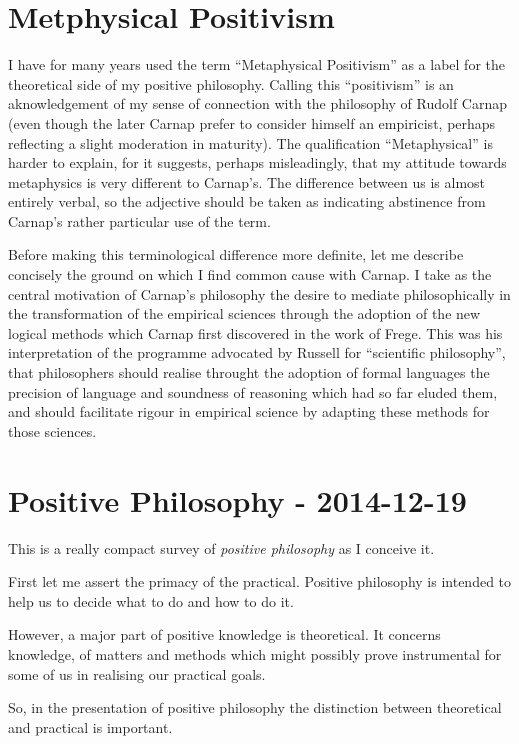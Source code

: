 \documentclass[10pt,titlepage]{article}
\begin{document}
\section{Metphysical Positivism}

I have for many years used the term ``Metaphysical Positivism'' as a label for the
theoretical side of my positive philosophy.
Calling this ``positivism'' is an aknowledgement of my sense of connection with the
philosophy of Rudolf Carnap (even though the later Carnap prefer to consider himself
an empiricist, perhaps reflecting a slight moderation in maturity).
The qualification ``Metaphysical'' is harder to explain, for it suggests, perhaps misleadingly,
that my attitude towards metaphysics is very different to Carnap's.
The difference between us is almost entirely verbal, so the adjective should be taken as
indicating abstinence from Carnap's rather particular use of the term.

Before making this terminological difference more definite, let me describe concisely the ground
on which I find common cause with Carnap.
I take as the central motivation of Carnap's philosophy the desire to mediate philosophically
in the transformation of the empirical sciences through the adoption of the new logical methods
which Carnap first discovered in the work of Frege.
This was his interpretation of the programme advocated by Russell for ``scientific philosophy'',
that philosophers should realise throught the adoption of formal languages the precision of language
and soundness of reasoning which had so far eluded them, and should facilitate rigour in empirical science by
adapting these methods for those sciences.

\section{Positive Philosophy - 2014-12-19}

This is a really compact survey of \emph{positive philosophy} as I conceive it.

First let me assert the primacy of the practical.
Positive philosophy is intended to help us to decide what to do and how to do it.

However, a major part of positive knowledge is theoretical.
It concerns knowledge, of matters and methods which might possibly prove instrumental for some of us in realising our practical goals.

So, in the presentation of positive philosophy the distinction between theoretical and practical is important.
\end{document}
